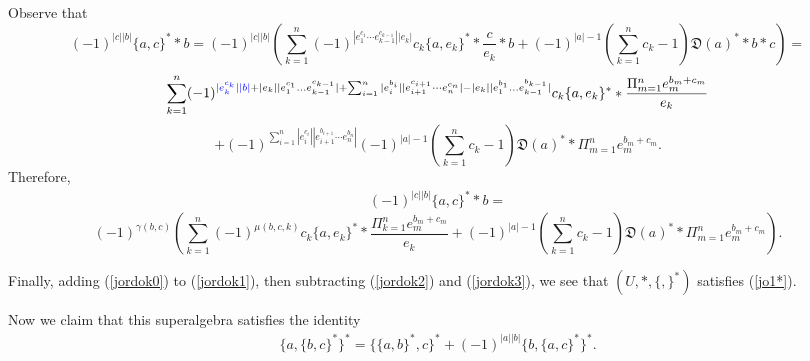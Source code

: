 \documentclass[secthm,seceqn,amsthm,ussrhead,reqno,12pt]{amsart}
\theoremstyle{plain}
\begin{document}
Observe that
$$
(-1)^{|c||b|}\{a,c\}^**b =
(-1)^{|c||b|}\left(\sum_{k=1}^n 
(-1)^{|e_1^{c_1}\cdots e_{k-1}^{c_{k-1}}||e_k|}
c_k\{a, e_k\}^** \frac{c}{e_k}*b + (-1)^{|a|-1} \left(\sum_{k=1}^n c_k-1\right){\mathfrak D}(a)^* *b*c\right)=
$$
$$
\sum_{k=1}^n  
(-1)^{ {\color{blue}|e_k^{c_k}||b|}+|e_k||e_1^{c_1} \ldots e_{k-1}^{c_{k-1}}| +  \sum_{i=1}^n |e_i^{b_i}| |e_{i+1}^{c_{i+1}}\cdots e_n^{c_n}|  - |e_k||e_{1}^{b_{1}} \ldots e_{k-1}^{b_{k-1}}|}  c_k\{a, e_k\}^**\frac{\Pi_{m=1}^n e_m^{b_m+c_m}}{e_k}
$$
$$
+ (-1)^{ \sum_{i=1}^n |e_i^{c_i}| |e_{i+1}^{b_{i+1}}\cdots e_n^{b_n}|}(-1)^{|a|-1} \left(\sum_{k=1}^n c_k-1\right) {\mathfrak D}(a)^* *  \Pi_{m=1}^n e_m^{b_m+c_m}.
$$
Therefore,
\begin{eqnarray}
	\label{jordok3}
	(-1)^{|c||b|}\{a,c\}^**b =
\end{eqnarray}
$$
(-1)^{\gamma(b,c)} 
\left(\sum_{k=1}^n 
(-1)^{\mu(b,c,k)}
c_k \{a, e_k\}^** \frac{ \Pi_{k=1}^n e_m^{b_m+c_m}}{e_k} +(-1)^{|a|-1}  \left(\sum_{k=1}^n c_k-1\right){\mathfrak D}(a)^**  \Pi_{m=1}^n e_m^{b_m+c_m}\right).
$$

Finally, 
adding (\ref{jordok0}) to (\ref{jordok1}),
then subtracting (\ref{jordok2}) and (\ref{jordok3}),
we see that
$(U,*,\{,\}^*)$
satisfies (\ref{jo1*}).

Now we claim that
this superalgebra satisfies the identity
\begin{eqnarray}
	\label{jo2*}
	\{a,\{b,c\}^*\}^*=\{\{a,b\}^*,c\}^*+(-1)^{|a||b|}\{b,\{a,c\}^*\}^*.
\end{eqnarray}
\end{document}

